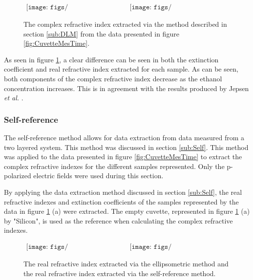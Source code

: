 \begin{figure}[H]
                \begin{center}$
								\begin{array}{cc}
                \texttt{[image: figs/n\_Ellips\_2\_layer.png]}&
                \texttt{[image: figs/k\_Ellips\_2\_layer.png]}
								\end{array}$
								\end{center}
	\caption[$2$ layer ellipsometry extracted complex refractive index]{The complex refractive index extracted via the method described in section \ref{sub:DLM} from the data presented in figure \ref{fig:CuvetteMesTime}.}
	\label{fig:CuvetteRefEllips}
\end{figure}

As seen in figure \ref{fig:CuvetteRefEllips}, a clear difference can be seen in both the extinction coefficient and real refractive index extracted for each sample. As can be seen, both components of the complex refractive index decrease as the ethanol concentration increases. This is in agreement with the results produced by Jepsen \textit{et al.} \cite{Jepsen-2007}.

\subsubsection{Self-reference}
\label{sub: HR-Silicon-Water-Eth_self}
The self-reference method allows for data extraction from data measured from a two layered system. This method was discussed in section \ref{sub:Self}. This method was applied to the data presented in figure \ref{fig:CuvetteMesTime} to extract the complex refractive indexes for the different samples represented. Only the p-polarized electric fields were used during this section.


By applying the data extraction method discussed in section \ref{sub:Self}, the real refractive indexes and extinction coefficients of the samples represented by the data in figure \ref{fig:CuvetteRefEllips} (a) were extracted. The empty cuvette, represented in figure \ref{fig:CuvetteRefEllips} (a) by "Silicon", is used as the reference when calculating the complex refractive indexes.

\begin{figure}[H]
                \begin{center}$
								\begin{array}{cc}
                \texttt{[image: figs/n\_SelfRefP\_2\_layer.png]}&
                \texttt{[image: figs/k\_SelfRefP\_2\_layer.png]}
								\end{array}$
								\end{center}
	\caption[Comparative n for two layer system]{The real refractive index extracted via the ellipsometric method and the real refractive index extracted via the self-reference method.}
	\label{fig:Comp_n_2_layer}
\end{figure}

